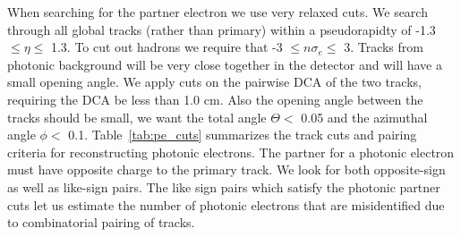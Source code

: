 When searching for the partner electron we use very relaxed cuts. We search through all global tracks (rather than primary) within a pseudorapidty of -1.3 $\leq \eta \leq$ 1.3. To cut out hadrons we require that -3 $\leq n\sigma_e \leq$ 3. Tracks from photonic background will be very close together in the detector and will have a small opening angle. We apply cuts on the pairwise DCA of the two tracks, requiring the DCA be less than 1.0 cm. Also the opening angle between the tracks should be small, we want the total angle $\Theta <$ 0.05 and the azimuthal angle $\phi < $ 0.1. Table~\ref{tab:pe_cuts} summarizes the track cuts and pairing criteria for reconstructing photonic electrons. The partner for a photonic electron must have opposite charge to the primary track. We look for both opposite-sign as well as like-sign pairs. The like sign pairs which satisfy the photonic partner cuts let us estimate the number of photonic electrons that are misidentified due to combinatorial pairing of tracks.

